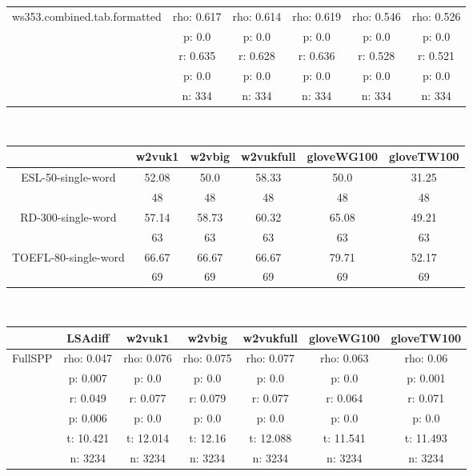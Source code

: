 \documentclass{article}
\begin{document}
\begin{tabular}{cccccc|}
\hline
\multicolumn{1}{|c|}{\multirow{5}{*}{ws353.combined.tab.formatted}} & rho: 0.617 & rho: 0.614 & rho: 0.619 & rho: 0.546 & rho: 0.526 \\
\multicolumn{1}{|c|}{} & p: 0.0 & p: 0.0 & p: 0.0 & p: 0.0 & p: 0.0 \\
\multicolumn{1}{|c|}{} & r: 0.635 & r: 0.628 & r: 0.636 & r: 0.528 & r: 0.521 \\
\multicolumn{1}{|c|}{} & p: 0.0 & p: 0.0 & p: 0.0 & p: 0.0 & p: 0.0 \\
\multicolumn{1}{|c|}{} & n: 334 & n: 334 & n: 334 & n: 334 & n: 334 \\
\hline
\end{tabular}\\
\begin{tabular}{cccccc|}\cline{2-6}
&\multicolumn{1}{|c}{w2vuk1} & w2vbig & w2vukfull & gloveWG100 & gloveTW100 \\\hline
\multicolumn{1}{|c|}{\multirow{2}{*}{ESL-50-single-word}} & 52.08 & 50.0 & 58.33 & 50.0 & 31.25 \\
\multicolumn{1}{|c|}{} & 48 & 48 & 48 & 48 & 48 \\
\hline
\multicolumn{1}{|c|}{\multirow{2}{*}{RD-300-single-word}} & 57.14 & 58.73 & 60.32 & 65.08 & 49.21 \\
\multicolumn{1}{|c|}{} & 63 & 63 & 63 & 63 & 63 \\
\hline
\multicolumn{1}{|c|}{\multirow{2}{*}{TOEFL-80-single-word}} & 66.67 & 66.67 & 66.67 & 79.71 & 52.17 \\
\multicolumn{1}{|c|}{} & 69 & 69 & 69 & 69 & 69 \\
\hline
\end{tabular}\\
\begin{tabular}{ccccccc|}\cline{2-7}
&\multicolumn{1}{|c}{LSAdiff} & w2vuk1 & w2vbig & w2vukfull & gloveWG100 & gloveTW100 \\\hline
\multicolumn{1}{|c|}{\multirow{6}{*}{FullSPP}} & rho: 0.047 & rho: 0.076 & rho: 0.075 & rho: 0.077 & rho: 0.063 & rho: 0.06 \\
\multicolumn{1}{|c|}{} & p: 0.007 & p: 0.0 & p: 0.0 & p: 0.0 & p: 0.0 & p: 0.001 \\
\multicolumn{1}{|c|}{} & r: 0.049 & r: 0.077 & r: 0.079 & r: 0.077 & r: 0.064 & r: 0.071 \\
\multicolumn{1}{|c|}{} & p: 0.006 & p: 0.0 & p: 0.0 & p: 0.0 & p: 0.0 & p: 0.0 \\
\multicolumn{1}{|c|}{} & t: 10.421 & t: 12.014 & t: 12.16 & t: 12.088 & t: 11.541 & t: 11.493 \\
\multicolumn{1}{|c|}{} & n: 3234 & n: 3234 & n: 3234 & n: 3234 & n: 3234 & n: 3234 \\
\hline
\end{tabular}\\
\end{document}

